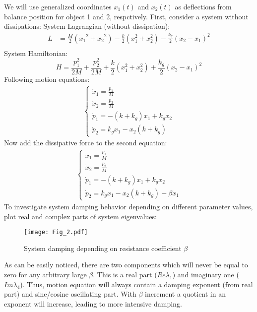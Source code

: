 \documentclass[]{article}
\begin{document}
We will use generalized coordinates $x_1(t)$ and $x_2(t)$ as deflections from balance position for  object 1 and 2, respctively.\newline
First, consider a system without dissipations: 
System Lagrangian (without dissipation):\newline
\begin{align*}
L &= \frac{M}{2}\left({\dot x_1}^2 + {\dot x_2}^2\right) - \frac{k}{2}\left(x_1^2 + x_2^2\right) - \frac{k_g}{2}\left(x_2-x_1\right)^2\\
\end{align*}
System Hamiltonian:
\begin{equation}
H = \frac{p_1^2}{2M} + \frac{p_2^2}{2M} + \frac{k}{2}\left(x_1^2 + x_2^2\right) + \frac{k_g}{2}\left(x_2 - x_1\right)^2
\end{equation}
Following motion equations:\newline
\begin{align*}
	\begin{cases}
		\dot x_1 = \frac{p_1}{M}
		\\
		\dot x_2 = \frac{p_2}{M}
		\\
		\dot p_1 = -(k+k_g)x_1 + k_g x_2
		\\
		\dot p_2 = k_gx_1 - x_2(k+k_g)
	\end{cases}
\end{align*}
Now add the dissipative force to the second equation:
\begin{align*}
	\begin{cases}
		\dot x_1 = \frac{p_1}{M}
		\\
		\dot x_2 = \frac{p_2}{M}
		\\
		\dot p_1 = -(k+k_g)x_1 + k_g x_2
		\\
		\dot p_2 = k_gx_1 - x_2(k+k_g) - \beta \dot x_1
	\end{cases}
\end{align*}
To investigate system damping behavior depending on different parameter values, plot real and complex parts of system eigenvalues:
\begin{figure}[h]
	\centering
	\texttt{[image: Fig\_2.pdf]}
	\caption{System damping depending on resistance coefficient $\beta$}
\end{figure}\newline

As can be easily noticed, there are two components which will never be equal to zero for any arbitrary large $\beta$. This is a real part ($Re \lambda_1$) and imaginary one ($Im \lambda_4$). Thus, motion equation will always contain a damping exponent (from real part) and sine/cosine oscillating part. With $\beta$ increment a quotient in an exponent will increase, leading to more intensive damping.
\end{document}
